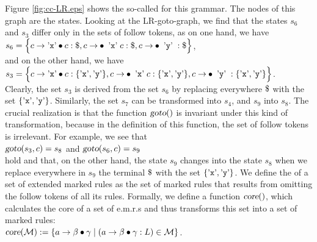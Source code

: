 Figure \ref{fig:cc-LR.eps} shows the so-called  for this grammar.
The nodes of this graph are the states.
Looking at the LR-goto-graph, we find that the states $s_6$ and
$s_3$ differ only in the sets of follow tokens, as on one hand, we have
\\[0.2cm]
\hspace*{1.3cm}
$s_6 = \Bigl\{ c \rightarrow \text{\saquoted{x}} \mdot c: \symbol{36}, 
                 c \rightarrow \mdot \text{\aquoted{x}} c:  \symbol{36},
                 c \rightarrow \mdot \text{\aquoted{y}}:    \symbol{36}
       \Bigr\}$, 
\\[0.2cm]
and on the other hand, we have
\\[0.2cm]
\hspace*{1.3cm}
$s_3 = \Bigl\{ c \rightarrow \text{\saquoted{x}} \mdot c: \{ \text{\saquoted{x}}, \text{\saquoted{y}} \}, 
                 c \rightarrow \mdot \text{\aquoted{x}} c:  \{ \text{\saquoted{x}}, \text{\saquoted{y}} \},
                 c \rightarrow \mdot \text{\aquoted{y}}:    \{ \text{\saquoted{x}}, \text{\saquoted{y}} \}  
       \Bigr\}$.
\\[0.2cm]
Clearly, the set $s_3$ is derived from the set $s_6$ by replacing everywhere $\symbol{36}$
with the set $\{ \text{\mbox{'\texttt{x}'}}, \text{\mbox{'\texttt{y}'}}\}$. Similarly, the set $s_7$ can be transformed into $s_4$,
and $s_9$ into $s_8$. The crucial realization is that the
function $\textsl{goto}()$ is invariant under this kind of transformation, because in the
definition of this function, the set of follow tokens is irrelevant. For example, we see that
\\[0.2cm]
\hspace*{1.3cm}
$\textsl{goto}(s_3, c) = s_8$ \quad and \quad 
$\textsl{goto}(s_6, c) = s_9$ 
\\[0.2cm]
hold and that, on the other hand, the state $s_9$ changes into the state $s_8$ when we
replace everywhere in $s_9$ the terminal $\symbol{36}$ with the set 
$\{ \text{\mbox{'\texttt{x}'}}, \text{\mbox{'\texttt{y}'}}\}$.  We define the
 of a set of extended marked rules as the set of marked
rules that results from omitting the follow tokens of all its rules.  Formally, we define a function
$\textsl{core}()$, which calculates the core of a set of e.m.r.s and thus transforms this set into a set of marked
rules:
\\[0.2cm]
\hspace*{1.3cm}
$\textsl{core}(\mathcal{M}) :=
   \{ a \rightarrow \beta \mdot \gamma \mid (a \rightarrow \beta \mdot \gamma:L) \in \mathcal{M} \}$.
